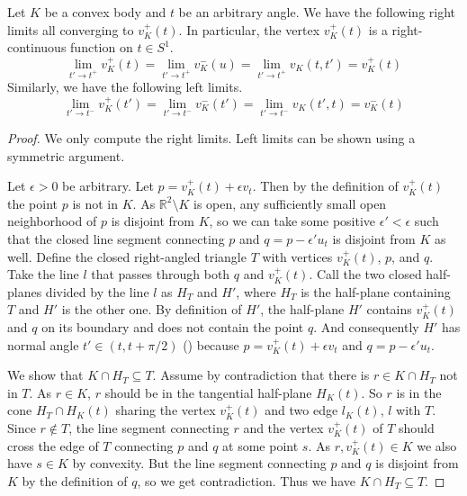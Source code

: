 \begin{theorem}

Let \(K\) be a convex body and \(t\) be an arbitrary angle. We have the following right limits all converging to \(v_K^+(t)\). In particular, the vertex \(v_K^+(t)\) is a right-continuous function on \(t \in S^1\).
\[
\lim_{ t' \to t^+ } v_K^+(t) = \lim_{ t' \to t^+ } v_K^-(u) = \lim_{ t' \to t^+ } v_K(t, t') = v_K^+(t)
\]
Similarly, we have the following left limits.
\[
\lim_{ t' \to t^- } v_K^+(t') = \lim_{ t' \to t^- } v_K^-(t') = \lim_{ t' \to t^- } v_K(t', t) = v_K^-(t)
\]

\label{thm:limits-converging-to-vertex}
\end{theorem}

\begin{proof}
We only compute the right limits. Left limits can be shown using a symmetric argument.

Let \(\epsilon > 0\) be arbitrary. Let \(p = v_K^+(t) + \epsilon v_t\). Then by the definition of \(v_K^+(t)\) the point \(p\) is not in \(K\). As \(\mathbb{R}^2 \setminus K\) is open, any sufficiently small open neighborhood of \(p\) is disjoint from \(K\), so we can take some positive \(\epsilon' < \epsilon\) such that the closed line segment connecting \(p\) and \(q = p - \epsilon' u_t\) is disjoint from \(K\) as well. Define the closed right-angled triangle \(T\) with vertices \(v_K^+(t)\), \(p\), and \(q\). Take the line \(l\) that passes through both \(q\) and \(v_K^+(t)\). Call the two closed half-planes divided by the line \(l\) as \(H_T\) and \(H'\), where \(H_T\) is the half-plane containing \(T\) and \(H'\) is the other one. By definition of \(H'\), the half-plane \(H'\) contains \(v_K^+(t)\) and \(q\) on its boundary and does not contain the point \(q\). And consequently \(H'\) has normal angle \(t' \in (t, t + \pi/2)\) () because \(p = v_K^+(t) + \epsilon v_t\) and \(q = p - \epsilon' u_t\).

We show that \(K \cap H_T \subseteq T\). Assume by contradiction that there is \(r \in K \cap H_T\) not in \(T\). As \(r \in K\), \(r\) should be in the tangential half-plane \(H_K(t)\). So \(r\) is in the cone \(H_T \cap H_K(t)\) sharing the vertex \(v_K^+(t)\) and two edge \(l_K(t)\), \(l\) with \(T\). Since \(r \not\in T\), the line segment connecting \(r\) and the vertex \(v_K^+(t)\) of \(T\) should cross the edge of \(T\) connecting \(p\) and \(q\) at some point \(s\). As \(r, v_K^+(t) \in K\) we also have \(s \in K\) by convexity. But the line segment connecting \(p\) and \(q\) is disjoint from \(K\) by the definition of \(q\), so we get contradiction. Thus we have \(K \cap H_T \subseteq T\).


\end{proof}
